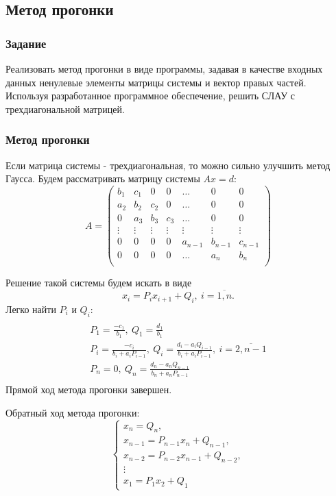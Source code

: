 \documentclass[a4paper,12pt]{article}
\begin{document}
\newpage

\subsection{Метод прогонки}
\subsubsection{Задание}
Реализовать метод прогонки в виде программы,
задавая в качестве входных данных ненулевые элементы матрицы
системы и вектор правых частей. Используя разработанное
программное обеспечение, решить СЛАУ с трехдиагональной матрицей.

\subsubsection{Метод прогонки}
Если матрица системы - трехдиагональная, то можно сильно улучшить метод Гаусса.
Будем рассматривать матрицу системы $Ax = d$:
$$
A =
\begin{pmatrix}
    b_1 & c_1 & 0 & 0 & \ldots & 0 & 0\\
    a_2 & b_2 & c_2 & 0 & \ldots & 0 & 0\\
    0 & a_3 & b_3 & c_3 & \ldots & 0 & 0\\

    \vdots & \vdots & \vdots & \vdots & \vdots & \vdots & \vdots \\
    0 & 0 & 0 & 0 & a_{n - 1} & b_{n - 1} & c_{n - 1} \\
    0 & 0 & 0 & 0 & \ldots &  a_{n} & b_{n} \\
\end{pmatrix}
$$

Решение такой системы будем искать в виде
$$
x_i = P_i x_{i + 1} + Q_i,\ i = \overline{1, n}.
$$
Легко найти $P_i$ и $Q_i$:
\begin{multline}
\\
P_1 = \frac{-c_1}{b_1},\ Q_1 = \frac{d_1}{b_1} \\
P_i = \frac{-c_i}{b_i + a_i P_{i - 1}},
\ Q_i = \frac{d_i - a_iQ_{i - 1}}{b_i + a_i P_{i - 1}},\ i = \overline{2, n - 1} \\
P_n = 0,\ Q_n = \frac{d_n - a_nQ_{n - 1}}{b_n + a_n P_{n - 1}} \\
\end{multline}
Прямой ход метода прогонки завершен.

Обратный ход метода прогонки:
$$
\left\{
    \begin{array}{l}
        x_n = Q_n, \\
        x_{n - 1} = P_{n - 1}x_n + Q_{n - 1}, \\
        x_{n - 2} = P_{n - 2}x_{n - 1} + Q_{n - 2}, \\
        \vdots \\
        x_1 = P_1 x_2 + Q_1
    \end{array}
    \right.
$$
\end{document}
